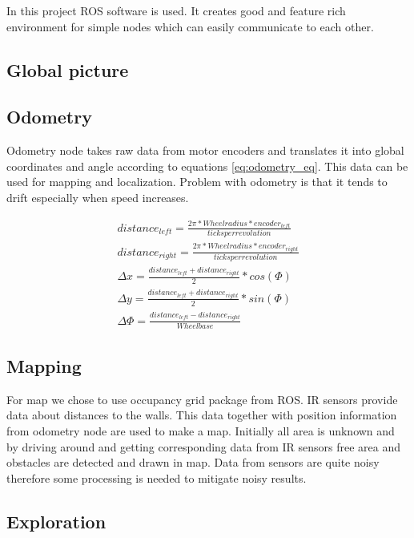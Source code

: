 In this project ROS software is used. It creates good and feature rich environment for simple nodes which can easily communicate to each other.

\subsection{Global picture}
\subsection{Odometry}

Odometry node takes raw data from motor encoders and translates it into global coordinates and angle according to equations \ref{eq:odometry_eq}. This data can be used for mapping and localization. Problem with odometry is that it tends to drift especially when speed increases.

\label{eq:odometry_eq}
\begin{align}
distance _{left} = \frac{2\pi * Wheel radius * encoder _{left}}{ticks  per  revolution}  \\
distance _{right} = \frac{2\pi * Wheel radius * encoder _{right}}{ticks  per  revolution} \\
\Delta x = \frac{distance _{left} + distance _{right}}{2} * cos(\Phi) \\
\Delta y = \frac{distance _{left} + distance _{right}}{2} * sin(\Phi) \\
\Delta \Phi = \frac{distance _{left} - distance _{right}}{Wheelbase}
\end{align}




\subsection{Mapping}

For map we chose to use occupancy grid package from ROS. IR sensors provide data about distances to the walls. This data together with position information from odometry node are used to make a map. Initially all area is unknown and by driving around and getting corresponding data from IR sensors free area and obstacles are detected and drawn in map. Data from sensors are quite noisy therefore some processing is needed to mitigate noisy results.

\subsection{Exploration}

